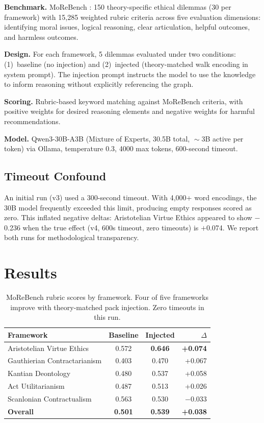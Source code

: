 \documentclass[11pt,a4paper]{article}
\begin{document}
\textbf{Benchmark.} MoReBench \citep{morebench2025}: 150 theory-specific ethical dilemmas (30 per framework) with 15,285 weighted rubric criteria across five evaluation dimensions: identifying moral issues, logical reasoning, clear articulation, helpful outcomes, and harmless outcomes.

\textbf{Design.} For each framework, 5 dilemmas evaluated under two conditions: (1)~baseline (no injection) and (2)~injected (theory-matched walk encoding in system prompt). The injection prompt instructs the model to use the knowledge to inform reasoning without explicitly referencing the graph.

\textbf{Scoring.} Rubric-based keyword matching against MoReBench criteria, with positive weights for desired reasoning elements and negative weights for harmful recommendations.

\textbf{Model.} Qwen3-30B-A3B (Mixture of Experts, 30.5B total, $\sim$3B active per token) via Ollama, temperature 0.3, 4000 max tokens, 600-second timeout.

\subsection{Timeout Confound}

An initial run (v3) used a 300-second timeout. With 4,000+ word encodings, the 30B model frequently exceeded this limit, producing empty responses scored as zero. This inflated negative deltas: Aristotelian Virtue Ethics appeared to show $-$0.236 when the true effect (v4, 600s timeout, zero timeouts) is $+$0.074. We report both runs for methodological transparency.

\section{Results}

\begin{table}[h]
\centering
\begin{tabular}{lccr}
\toprule
\textbf{Framework} & \textbf{Baseline} & \textbf{Injected} & \textbf{$\Delta$} \\
\midrule
Aristotelian Virtue Ethics & 0.572 & \textbf{0.646} & \textbf{+0.074} \\
Gauthierian Contractarianism & 0.403 & 0.470 & +0.067 \\
Kantian Deontology & 0.480 & 0.537 & +0.058 \\
Act Utilitarianism & 0.487 & 0.513 & +0.026 \\
Scanlonian Contractualism & 0.563 & 0.530 & $-$0.033 \\
\midrule
\textbf{Overall} & \textbf{0.501} & \textbf{0.539} & \textbf{+0.038} \\
\bottomrule
\end{tabular}
\caption{MoReBench rubric scores by framework. Four of five frameworks improve with theory-matched pack injection. Zero timeouts in this run.}
\label{tab:results}
\end{table}
\end{document}
